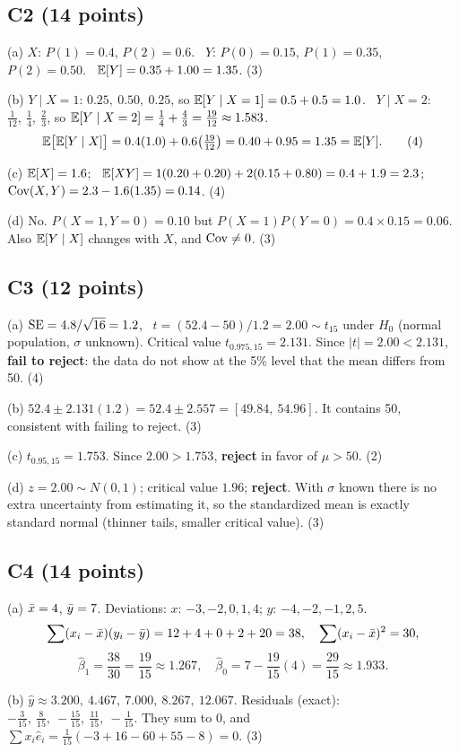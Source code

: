 \documentclass[11pt]{article}
\begin{document}
\subsection{C2 (14 points)}
(a) $X$: $P(1)=0.4$, $P(2)=0.6$. \ $Y$: $P(0)=0.15$, $P(1)=0.35$, $P(2)=0.50$. \ $\mathbb{E}[Y]=0.35+1.00=1.35$. \hfill (3)

(b) $Y\mid X=1$: $0.25,\ 0.50,\ 0.25$, so $\mathbb{E}[Y\mid X=1]=0.5+0.5=1.0$. \ $Y\mid X=2$: $\tfrac1{12},\ \tfrac14,\ \tfrac23$, so $\mathbb{E}[Y\mid X=2]=\tfrac14+\tfrac43=\tfrac{19}{12}\approx1.583$.
\[ \mathbb{E}\big[\mathbb{E}[Y\mid X]\big]=0.4(1.0)+0.6\big(\tfrac{19}{12}\big)=0.40+0.95=1.35=\mathbb{E}[Y]. \tag*{(4)} \]

(c) $\mathbb{E}[X]=1.6$; \ $\mathbb{E}[XY]=1(0.20+0.20)+2(0.15+0.80)=0.4+1.9=2.3$; \ $\operatorname{Cov}(X,Y)=2.3-1.6(1.35)=0.14$. \hfill (4)

(d) No. $P(X=1,Y=0)=0.10$ but $P(X=1)P(Y=0)=0.4\times0.15=0.06$. Also $\mathbb{E}[Y\mid X]$ changes with $X$, and $\operatorname{Cov}\neq0$. \hfill (3)

\subsection{C3 (12 points)}
(a) $\operatorname{SE}=4.8/\sqrt{16}=1.2$, \ $t=(52.4-50)/1.2=2.00\sim t_{15}$ under $H_0$ (normal population, $\sigma$ unknown). Critical value $t_{0.975,15}=2.131$. Since $|t|=2.00<2.131$, \textbf{fail to reject}: the data do not show at the 5\% level that the mean differs from 50. \hfill (4)

(b) $52.4\pm2.131(1.2)=52.4\pm2.557=[49.84,\ 54.96]$. It contains 50, consistent with failing to reject. \hfill (3)

(c) $t_{0.95,15}=1.753$. Since $2.00>1.753$, \textbf{reject} in favor of $\mu>50$. \hfill (2)

(d) $z=2.00\sim N(0,1)$; critical value $1.96$; \textbf{reject}. With $\sigma$ known there is no extra uncertainty from estimating it, so the standardized mean is exactly standard normal (thinner tails, smaller critical value). \hfill (3)

\subsection{C4 (14 points)}
(a) $\bar{x}=4$, $\bar{y}=7$. Deviations: $x$: $-3,-2,0,1,4$; $y$: $-4,-2,-1,2,5$.
\[ \sum(x_i-\bar{x})(y_i-\bar{y})=12+4+0+2+20=38, \quad \sum(x_i-\bar{x})^2=30, \]\[ \hat\beta_1=\frac{38}{30}=\frac{19}{15}\approx1.267, \quad \hat\beta_0=7-\frac{19}{15}(4)=\frac{29}{15}\approx1.933. \tag*{(5)} \]

(b) $\hat y\approx3.200,\ 4.467,\ 7.000,\ 8.267,\ 12.067$. Residuals (exact): $-\tfrac{3}{15},\ \tfrac{8}{15},\ -\tfrac{15}{15},\ \tfrac{11}{15},\ -\tfrac{1}{15}$. They sum to $0$, and $\sum x_i\hat e_i=\tfrac{1}{15}(-3+16-60+55-8)=0$. \hfill (3)
\end{document}

